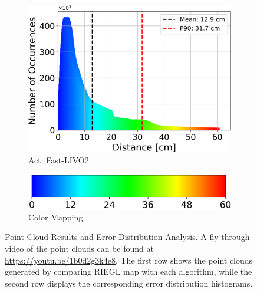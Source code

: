 \documentclass[conference]{IEEEtran}
\begin{document}
\begin{figure}
\begin{subfigure}{0.18\textwidth}
    \centering
    \includegraphics[width=\textwidth]{pics/histogram_results/histogram_cond_actuated_livo.png}
    \caption{Act. Fast-LIVO2}
    \label{fig:hist_act_livo}
\end{subfigure}
\begin{subfigure}{0.16\textwidth}
    \centering
    \includegraphics[width=\textwidth]{pics/histogram_results/hsv.png}
    \caption{Color Mapping}
    \label{fig:hsv}
\end{subfigure}
\caption{Point Cloud Results and Error Distribution Analysis. A fly through video of the point clouds can be found at \url{https://youtu.be/1b0d2g3k4e8}. The first row shows the point clouds generated by comparing RIEGL map with each algorithm, while the second row displays the corresponding error distribution histograms.}
\label{fig:combined_results}
\end{figure}
\end{document}
